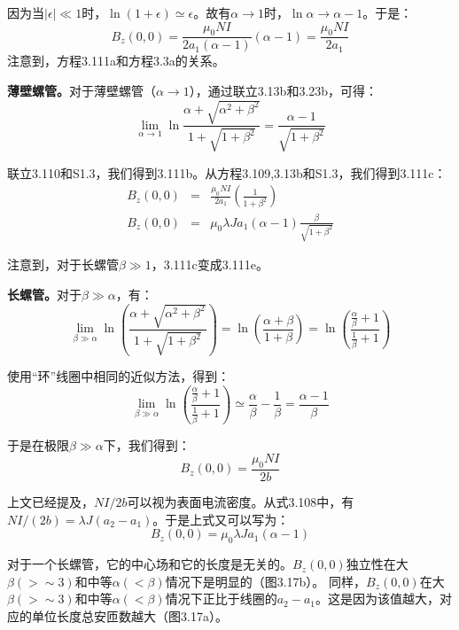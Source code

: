 因为当$|\epsilon|\ll 1$时，$\ln (1+\epsilon)\simeq \epsilon$。故有$\alpha\rightarrow 1$时，$\ln \alpha\rightarrow \alpha-1$。于是：
\begin{equation}
B_z(0,0)=\frac{\mu_0NI}{2a_1(\alpha-1)}(\alpha-1)=\frac{\mu_0NI}{2a_1}%
\end{equation}
注意到，方程3.111a和方程3.3a的关系。

\textbf{薄壁螺管。}对于薄壁螺管（$\alpha\rightarrow 1$），通过联立3.13b和3.23b，可得：
\begin{equation}
\lim_{\alpha\rightarrow 1}\ln\frac{\alpha+\sqrt{\alpha^2+\beta^2}}{1+\sqrt{1+\beta^2}}=\frac{\alpha-1}{\sqrt{1+\beta^2}}%
\end{equation}

联立3.110和S1.3，我们得到3.111b。从方程3.109,3.13b和S1.3，我们得到3.111c：
\begin{eqnarray}
B_z(0,0)&=&\frac{\mu_0 NI}{2a_1}(\frac{1}{1+\beta^2})\\ %
B_z(0,0)&=&\mu_0 \lambda Ja_1(\alpha-1)\frac{\beta}{\sqrt{1+\beta^2}}%
\end{eqnarray}

注意到，对于长螺管$\beta\gg 1$，3.111c变成3.111e。

\textbf{长螺管。}对于$\beta\gg \alpha$，有：
\begin{equation}
\lim_{\beta\gg\alpha}\ln\left(\frac{\alpha+\sqrt{\alpha^2+\beta^2}}{1+\sqrt{1+\beta^2}}\right)=\ln\left(\frac{\alpha+\beta}{1+\beta}\right)=\ln\left(\frac{\frac{\alpha}{\beta}+1}{\frac{1}{\beta}+1}\right)%
\end{equation}

使用“环”线圈中相同的近似方法，得到：
\begin{equation}
\lim_{\beta\gg\alpha}\ln\left(\frac{\frac{\alpha}{\beta}+1}{\frac{1}{\beta}+1}\right)\simeq\frac{\alpha}{\beta}-\frac{1}{\beta}=\frac{\alpha-1}{\beta}%
\end{equation}

于是在极限$\beta\gg\alpha$下，我们得到：
\begin{equation}
B_z(0,0)=\frac{\mu_0NI}{2b}%
\end{equation}

上文已经提及，$NI/2b$可以视为表面电流密度。从式3.108中，有$NI/(2b)=\lambda J (a_2-a_1)$。于是上式又可以写为：
\begin{equation}
B_z(0,0)=\mu_0\lambda Ja_1(\alpha-1)%
\end{equation}

对于一个长螺管，它的中心场和它的长度是无关的。$B_z(0,0)$独立性在大$\beta(>\sim 3)$和中等$\alpha(<\beta)$情况下是明显的（图3.17b）。
同样，$B_z(0,0)$在大$\beta(>\sim 3)$和中等$\alpha(<\beta)$情况下正比于线圈的$a_2-a_1$。这是因为该值越大，对应的单位长度总安匝数越大（图3.17a）。

